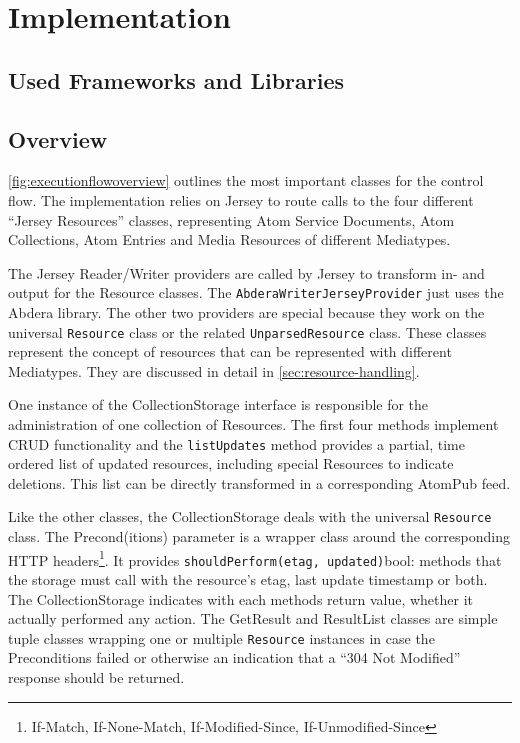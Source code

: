 \documentclass[12pt,a4paper,twoside]{scrartcl}		%
\begin{document}
\section{Implementation}
\label{sec:implementation}

\subsection{Used Frameworks and Libraries}
\label{sec:used-fram-libr}


\subsection{Overview}
\label{sec:overview}

\autoref{fig:executionflowoverview} outlines the most important classes for the
control flow. The implementation relies on Jersey to route calls to the four
different ``Jersey Resources'' classes, representing Atom Service Documents,
Atom Collections, Atom Entries and Media Resources of different Mediatypes.

The Jersey Reader/Writer providers are called by Jersey to transform in- and
output for the Resource classes. The \lstinline:AbderaWriterJerseyProvider: just
uses the Abdera library. The other two providers are special because they work
on the universal \lstinline:Resource: class or the related
\lstinline:UnparsedResource: class. These classes represent the concept of
resources that can be represented with different Mediatypes. They are discussed
in detail in \autoref{sec:resource-handling}.

One instance of the CollectionStorage interface is responsible for the
administration of one collection of Resources. The first four methods implement
CRUD functionality and the \lstinline:listUpdates: method provides a partial,
time ordered list of updated resources, including special Resources to indicate
deletions. This list can be directly transformed in a corresponding AtomPub
feed.

Like the other classes, the CollectionStorage deals with the universal
\lstinline:Resource: class. The Precond(itions) parameter is a wrapper class
around the corresponding HTTP headers\footnote{If-Match, If-None-Match,
  If-Modified-Since, If-Unmodified-Since}. It provides
\lstinline:shouldPerform(etag, updated):bool: methods that the storage must call
with the resource's etag, last update timestamp or both. The CollectionStorage
indicates with each methods return value, whether it actually performed any
action. The GetResult and ResultList classes are simple tuple classes wrapping
one or multiple \lstinline:Resource: instances in case the Preconditions failed
or otherwise an indication that a ``304 Not Modified'' response should be
returned.
\end{document}
